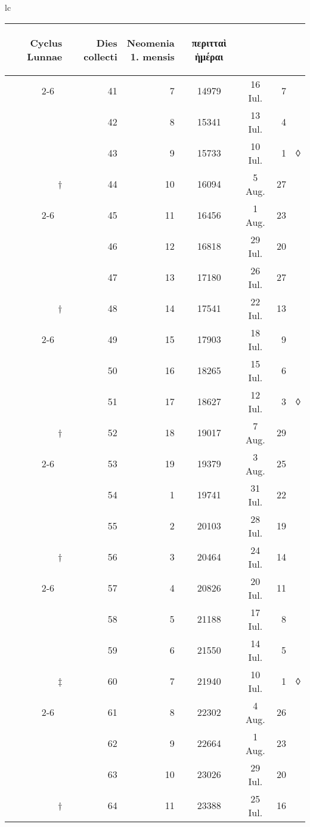 \begin{tabular}{lc}
\begin{tabular}[t]{r rrccr l}
\begin{rotate}{60}Cyclus Lunnae\end{rotate} &
\begin{rotate}{60}Dies collecti\end{rotate} &
\begin{rotate}{60}\hspace{5pt}\parbox[t]{3cm}{Neomenia\\1. mensis}\end{rotate} &
\begin{rotate}{60}\textgreek{περιτταὶ ἡμέραι}\end{rotate} &
~
\\
\cline{2-6}
~ & 41 &  7 & 14979 & 16 Iul. &  7 \\
~ & 42 &  8 & 15341 & 13 Iul. &  4 \\
~ & 43 &  9 & 15733 & 10 Iul. &  1 & ◊ \\
† & 44 & 10 & 16094 &  5 Aug. & 27 \\
\cline{2-6}
~ & 45 & 11 & 16456 &  1 Aug. & 23 \\
~ & 46 & 12 & 16818 & 29 Iul. & 20 \\
~ & 47 & 13 & 17180 & 26 Iul. & 27 \\
† & 48 & 14 & 17541 & 22 Iul. & 13 \\
\cline{2-6}
~ & 49 & 15 & 17903 & 18 Iul. &  9 \\
~ & 50 & 16 & 18265 & 15 Iul. &  6 \\
~ & 51 & 17 & 18627 & 12 Iul. &  3 & ◊ \\
† & 52 & 18 & 19017 &  7 Aug. & 29 \\
\cline{2-6}
~ & 53 & 19 & 19379 &  3 Aug. & 25 \\
~ & 54 &  1 & 19741 & 31 Iul. & 22 \\
~ & 55 &  2 & 20103 & 28 Iul. & 19 \\
† & 56 &  3 & 20464 & 24 Iul. & 14 \\
\cline{2-6}
~ & 57 &  4 & 20826 & 20 Iul. & 11 \\
~ & 58 &  5 & 21188 & 17 Iul. &  8 \\
~ & 59 &  6 & 21550 & 14 Iul. &  5 \\
‡ & 60 &  7 & 21940 & 10 Iul. &  1 & ◊ \\
\cline{2-6}
~ & 61 &  8 & 22302 &  4 Aug. & 26 \\
~ & 62 &  9 & 22664 &  1 Aug. & 23 \\
~ & 63 & 10 & 23026 & 29 Iul. & 20 \\
† & 64 & 11 & 23388 & 25 Iul. & 16 \\

\end{tabular}
\end{tabular}
